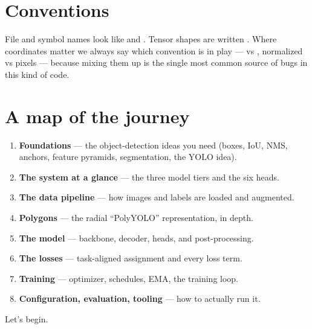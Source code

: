 \section*{Conventions}
File and symbol names look like  and .
Tensor shapes are written \code{[N, 72]}. Where coordinates matter we always say which
convention is in play ---  vs , normalized \code{[0,1]} vs pixels ---
because mixing them up is the single most common source of bugs in this kind of code.

\section*{A map of the journey}
\begin{enumerate}[leftmargin=1.4em,itemsep=2pt]
  \item \textbf{Foundations} --- the object-detection ideas you need (boxes, IoU, NMS,
        anchors, feature pyramids, segmentation, the YOLO idea).
  \item \textbf{The system at a glance} --- the three model tiers and the six heads.
  \item \textbf{The data pipeline} --- how images and labels are loaded and augmented.
  \item \textbf{Polygons} --- the radial ``PolyYOLO'' representation, in depth.
  \item \textbf{The model} --- backbone, decoder, heads, and post-processing.
  \item \textbf{The losses} --- task-aligned assignment and every loss term.
  \item \textbf{Training} --- optimizer, schedules, EMA, the training loop.
  \item \textbf{Configuration, evaluation, tooling} --- how to actually run it.
\end{enumerate}

\noindent Let's begin.
